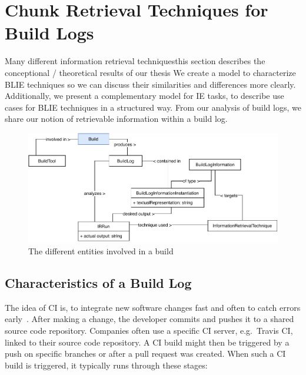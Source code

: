\documentclass[\myrootdir/main.tex]{subfiles}
\begin{document}
\chapter{Chunk Retrieval Techniques for Build Logs}
\label{sec:ir-techniques}
Many different information retrieval techniques\textellipsis this section describes the conceptional / theoretical results of our thesis\textellipsis
We create a model to characterize BLIE techniques so we can discuss their similarities and differences more clearly.
Additionally, we present a complementary model for IE tasks, to describe use cases for BLIE techniques in a structured way.
From our analysis of build logs, we share our notion of retrievable information within a build log.

\begin{figure}[htbp]
	\centering
	\includegraphics[width=\textwidth, clip]{img/build-overview.pdf}
	\caption{The different entities involved in a build}
	\label{fig:build-overview}
\end{figure}

\section{Characteristics of a Build Log}
\label{sec:bl-characteristics}
The idea of CI is, to integrate new software changes fast and often to catch errors early~\cite{humble2010continuous}.
After making a change, the developer commits and pushes it to a shared source code repository.
Companies often use a specific CI server, e.g.\ Travis CI, linked to their source code repository.
A CI build might then be triggered by a push on specific branches or after a pull request was created.
When such a CI build is triggered, it typically runs through these stages:
\end{document}
